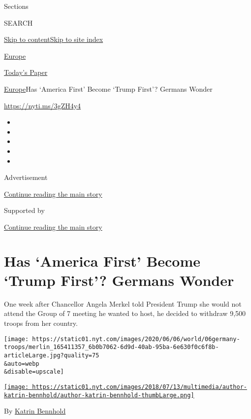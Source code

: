 Sections

SEARCH

\protect\hyperlink{site-content}{Skip to
content}\protect\hyperlink{site-index}{Skip to site index}

\href{https://www.nytimes.com/section/world/europe}{Europe}

\href{https://myaccount.nytimes.com/auth/login?response_type=cookie\&client_id=vi}{}

\href{https://www.nytimes.com/section/todayspaper}{Today's Paper}

\href{/section/world/europe}{Europe}\textbar{}Has `America First' Become
`Trump First'? Germans Wonder

\url{https://nyti.ms/3gZH4y4}

\begin{itemize}
\item
\item
\item
\item
\item
\end{itemize}

Advertisement

\protect\hyperlink{after-top}{Continue reading the main story}

Supported by

\protect\hyperlink{after-sponsor}{Continue reading the main story}

\hypertarget{has-america-first-become-trump-first-germans-wonder}{%
\section{Has `America First' Become `Trump First'? Germans
Wonder}\label{has-america-first-become-trump-first-germans-wonder}}

One week after Chancellor Angela Merkel told President Trump she would
not attend the Group of 7 meeting he wanted to host, he decided to
withdraw 9,500 troops from her country.

\texttt{[image: https://static01.nyt.com/images/2020/06/06/world/06germany-troops/merlin\_165411357\_6b0b7062-6d9d-40ab-95ba-6e630f0c6f8b-articleLarge.jpg?quality=75\\\&auto=webp\\\&disable=upscale]}

\href{https://www.nytimes.com/by/katrin-bennhold}{\texttt{[image: https://static01.nyt.com/images/2018/07/13/multimedia/author-katrin-bennhold/author-katrin-bennhold-thumbLarge.png]}}

By \href{https://www.nytimes.com/by/katrin-bennhold}{Katrin Bennhold}

